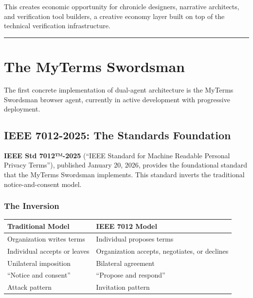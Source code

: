 \documentclass[
]{article}
\newcounter{none} %
\begin{document}
This creates economic opportunity for chronicle designers, narrative
architects, and verification tool builders, a creative economy layer
built on top of the technical verification infrastructure.

\begin{center}\rule{0.5\linewidth}{0.5pt}\end{center}

\section{The MyTerms Swordsman}\label{the-myterms-swordsman}

The first concrete implementation of dual-agent architecture is the
MyTerms Swordsman browser agent, currently in active development with
progressive deployment.

\subsection{IEEE 7012-2025: The Standards
Foundation}\label{ieee-7012-2025-the-standards-foundation}

\textbf{IEEE Std 7012™-2025} (``IEEE Standard for Machine Readable
Personal Privacy Terms''), published January 20, 2026, provides the
foundational standard that the MyTerms Swordsman implements. This
standard inverts the traditional notice-and-consent model.

\subsubsection{The Inversion}\label{the-inversion}

{\def\LTcaptype{none} %
\begin{longtable}[]{@{}
  >{\raggedright\arraybackslash}p{}
  >{\raggedright\arraybackslash}p{}@{}}
\toprule\noalign{}
\begin{minipage}[b]{\linewidth}\raggedright
Traditional Model
\end{minipage} & \begin{minipage}[b]{\linewidth}\raggedright
IEEE 7012 Model
\end{minipage} \\
\midrule\noalign{}
\endhead
\bottomrule\noalign{}
\endlastfoot
Organization writes terms & Individual proposes terms \\
Individual accepts or leaves & Organization accepts, negotiates, or
declines \\
Unilateral imposition & Bilateral agreement \\
``Notice and consent'' & ``Propose and respond'' \\
Attack pattern & Invitation pattern \\
\end{longtable}
}
\end{document}
